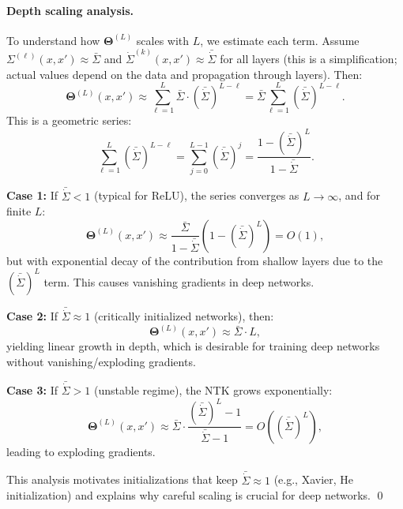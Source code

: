 \documentclass{article}
\newcommand{\Kop}{\boldsymbol{\Theta}}
\begin{document}
\paragraph{Depth scaling analysis.}
To understand how \( \Kop^{(L)} \) scales with \( L \), we estimate each term. Assume \( \Sigma^{(\ell)}(x,x') \approx \bar{\Sigma} \) and \( \dot{\Sigma}^{(k)}(x,x') \approx \bar{\dot{\Sigma}} \) for all layers (this is a simplification; actual values depend on the data and propagation through layers). Then:
\[
\Kop^{(L)}(x,x') \approx \sum_{\ell=1}^{L} \bar{\Sigma} \cdot (\bar{\dot{\Sigma}})^{L-\ell} = \bar{\Sigma} \sum_{\ell=1}^{L} (\bar{\dot{\Sigma}})^{L-\ell}.
\]
This is a geometric series:
\[
\sum_{\ell=1}^{L} (\bar{\dot{\Sigma}})^{L-\ell} = \sum_{j=0}^{L-1} (\bar{\dot{\Sigma}})^{j} = \frac{1 - (\bar{\dot{\Sigma}})^L}{1 - \bar{\dot{\Sigma}}}.
\]

\textbf{Case 1: } If \( \bar{\dot{\Sigma}} < 1 \) (typical for ReLU), the series converges as \( L \to \infty \), and for finite \( L \):
\[
\Kop^{(L)}(x,x') \approx \frac{\bar{\Sigma}}{1 - \bar{\dot{\Sigma}}} \left(1 - (\bar{\dot{\Sigma}})^L\right) = O(1),
\]
but with exponential decay of the contribution from shallow layers due to the \( (\bar{\dot{\Sigma}})^L \) term. This causes vanishing gradients in deep networks.

\textbf{Case 2: } If \( \bar{\dot{\Sigma}} \approx 1 \) (critically initialized networks), then:
\[
\Kop^{(L)}(x,x') \approx \bar{\Sigma} \cdot L,
\]
yielding linear growth in depth, which is desirable for training deep networks without vanishing/exploding gradients.

\textbf{Case 3: } If \( \bar{\dot{\Sigma}} > 1 \) (unstable regime), the NTK grows exponentially:
\[
\Kop^{(L)}(x,x') \approx \bar{\Sigma} \cdot \frac{(\bar{\dot{\Sigma}})^L - 1}{\bar{\dot{\Sigma}} - 1} = O((\bar{\dot{\Sigma}})^L),
\]
leading to exploding gradients. 

This analysis motivates initializations that keep \( \bar{\dot{\Sigma}} \approx 1 \) (e.g., Xavier, He initialization) and explains why careful scaling is crucial for deep networks. \qed

\vspace{2em}
\end{document}
